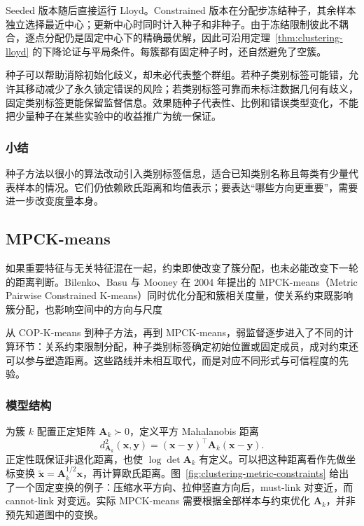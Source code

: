 Seeded 版本随后直接运行 Lloyd。Constrained 版本在分配步冻结种子，其余样本独立选择最近中心；更新中心时同时计入种子和非种子。由于冻结限制彼此不耦合，逐点分配仍是固定中心下的精确最优解，因此可沿用定理~\ref{thm:clustering-lloyd} 的下降论证与平局条件。每簇都有固定种子时，还自然避免了空簇。

种子可以帮助消除初始化歧义，却未必代表整个群组。若种子类别标签可能错，允许其移动减少了永久锁定错误的风险；若类别标签可靠而未标注数据几何有歧义，固定类别标签更能保留监督信息。效果随种子代表性、比例和错误类型变化，不能把少量种子在某些实验中的收益推广为统一保证。

\subsubsection{小结}

种子方法以很小的算法改动引入类别标签信息，适合已知类别名称且每类有少量代表样本的情况。它们仍依赖欧氏距离和均值表示；要表达“哪些方向更重要”，需要进一步改变度量本身。

\subsection{MPCK-means}
\label{sec:clustering-mpck}

如果重要特征与无关特征混在一起，约束即使改变了簇分配，也未必能改变下一轮的距离判断。Bilenko、Basu 与 Mooney 在 2004 年提出的 MPCK-means（Metric Pairwise Constrained K-means）同时优化分配和簇相关度量，使关系约束既影响簇分配，也影响空间中的方向与尺度

从 COP-K-means 到种子方法，再到 MPCK-means，弱监督逐步进入了不同的计算环节：关系约束限制分配，种子类别标签确定初始位置或固定成员，成对约束还可以参与塑造距离。这些路线并未相互取代，而是对应不同形式与可信程度的先验。

\subsubsection{模型结构}

为簇 $k$ 配置正定矩阵 $\bm{A}_k\succ0$，定义平方 Mahalanobis 距离
\[
 d_{\bm{A}_k}^2(\bm{x},\bm{y})
 =(\bm{x}-\bm{y})^\top\bm{A}_k(\bm{x}-\bm{y}).
\]
正定性既保证非退化距离，也使 $\log\det\bm{A}_k$ 有定义。可以把这种距离看作先做坐标变换 $\tilde{\bm{x}}=\bm{A}_k^{1/2}\bm{x}$，再计算欧氏距离。图~\ref{fig:clustering-metric-constraints} 给出了一个固定变换的例子：压缩水平方向、拉伸竖直方向后，must-link 对变近，而 cannot-link 对变远。实际 MPCK-means 需要根据全部样本与约束优化 $\bm{A}_k$，并非预先知道图中的变换。

